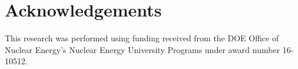 \section{Acknowledgements}
This research was performed using funding received from the DOE Office of
Nuclear Energy's Nuclear Energy University Programs under award number
16-10512. 
